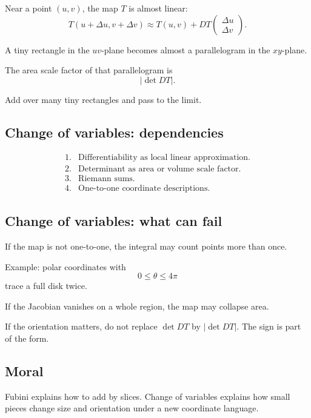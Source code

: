 Near a point \((u,v)\), the map \(T\) is almost linear:
\[
    T(u+\Delta u,v+\Delta v)
    \approx
    T(u,v)+DT
    \begin{pmatrix}
    \Delta u\\
    \Delta v
    \end{pmatrix}.
\]

A tiny rectangle in the \(uv\)-plane becomes almost a parallelogram in the \(xy\)-plane.

The area scale factor of that parallelogram is
\[
\boxed{
    |\det DT|.
}
\]

Add over many tiny rectangles and pass to the limit.

\subsection*{Change of variables: dependencies}

\[
\begin{array}{ll}
1. & \text{Differentiability as local linear approximation.}\\[1mm]
2. & \text{Determinant as area or volume scale factor.}\\[1mm]
3. & \text{Riemann sums.}\\[1mm]
4. & \text{One-to-one coordinate descriptions.}
\end{array}
\]

\subsection*{Change of variables: what can fail}

If the map is not one-to-one, the integral may count points more than once.

Example: polar coordinates with
\[
    0\le \theta\le4\pi
\]
trace a full disk twice.

If the Jacobian vanishes on a whole region, the map may collapse area.

If the orientation matters, do not replace \(\det DT\) by \(|\det DT|\).  The sign is part
of the form.

\subsection*{Moral}

Fubini explains how to add by slices.  Change of variables explains how small pieces
change size and orientation under a new coordinate language.

